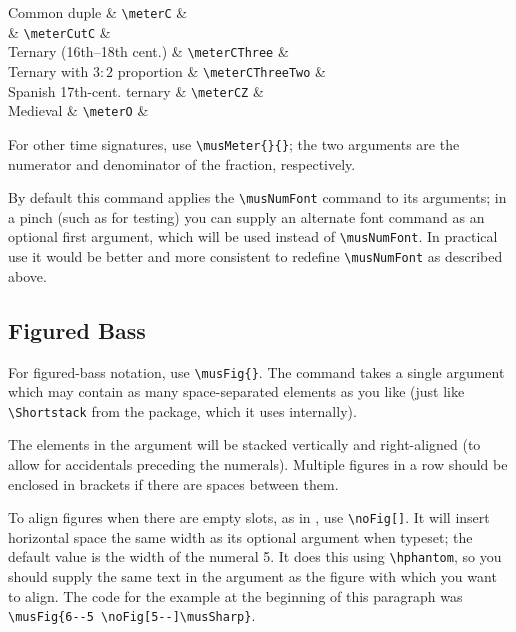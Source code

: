 \documentclass{article}
\begin{document}
\begin{codetable}
    Common duple & \verb|\meterC| & \meterC\\
     & \verb|\meterCutC| & \meterCutC\\
    Ternary (16th--18th cent.) & \verb|\meterCThree| & \meterCThree\\
    Ternary with $3:2$ proportion & \verb|\meterCThreeTwo| &
    \meterCThreeTwo\\
    Spanish 17th-cent. ternary & \verb|\meterCZ| & \meterCZ\\
    Medieval  & \verb|\meterO| & \meterO\\
\end{codetable}

For other time signatures, use \verb|\musMeter{}{}|; the two arguments are the
numerator and denominator of the fraction, respectively.

By default this command applies the \verb|\musNumFont| command to its
arguments; in a pinch (such as for testing) you can supply an alternate font
command as an optional first argument, which will be used instead of
\verb|\musNumFont|.
In practical use it would be better and more consistent to redefine
\verb|\musNumFont| as described above.


\subsection{Figured Bass}

For figured-bass notation, use \verb|\musFig{}|.
The command takes a single argument which may contain as many space-separated
elements as you like (just like \verb|\Shortstack| from the 
package, which it uses internally).

The elements in the argument will be stacked vertically and right-aligned (to
allow for accidentals preceding the numerals).
Multiple figures in a row should be enclosed in brackets if there are spaces
between them.

To align figures when there are empty slots, as in , use \verb|\noFig[]|. 
It will insert horizontal space the same width as its optional argument when
typeset; the default value is the width of the numeral 5.
It does this using \verb|\hphantom|, so you should supply the same text in the
argument as the figure with which you want to align. 
The code for the example at the beginning of this paragraph was 
\verb|\musFig{6--5 \noFig[5--]\musSharp}|.
\end{document}
